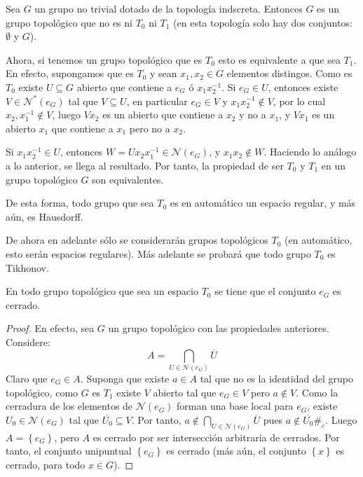 \documentclass[12pt]{report}
\theoremstyle{largebreak}
\newcommand{\N}[1]{\ensuremath{\mathscr{N}(#1)}}
\newcommand{\Ns}[1]{\ensuremath{\mathscr{N}^*(#1)}}
\newcommand{\contradiction}{\ensuremath{\#_c}}
\begin{document}
    \begin{exa}
        Sea $G$ un grupo no trivial dotado de la topología indscreta. Entonces $G$ es un grupo topológico que no es ni $T_0$ ni $T_1$ (en esta topología solo hay dos conjuntos: $\emptyset$ y $G$).
    
        Ahora, si tenemos un grupo topológico que es $T_0$ esto es equivalente a que sea $T_1$. En efecto, supongamos que es $T_0$ y sean $x_1,x_2\in G$ elementos distingos. Como es $T_0$ existe $U\subseteq G$ abierto que contiene a $e_G$ ó $x_1x_2^{-1}$. Si $e_G\in U$, entonces existe $V\in\Ns{e_G}$ tal que $V\subseteq U$, en particular $e_G\in V$ y $x_1x_2^{-1}\notin V$, por lo cual $x_2,x_1^{-1}\notin V$, luego $Vx_2$ es un abierto que contiene a $x_2$ y no a $x_1$, y $Vx_1$ es un abierto $x_1$ que contiene a $x_1$ pero no a $x_2$.

        Si $x_1x_2^{-1}\in U$, entonces $W=Ux_2x_1^{-1}\in\N{e_G}$, y $x_1x_2\notin W$. Haciendo lo análogo a lo anterior, se llega al resultado. Por tanto, la propiedad de ser $T_0$ y $T_1$ en un grupo topológico $G$ son equivalentes.
        
        De esta forma, todo grupo que sea $T_0$ es en automático un espacio regular, y más aún, es Hausdorff.
    \end{exa}

    De ahora en adelante sólo se considerarán grupos topológicos $T_0$ (en automático, esto serán espacios regulares). Más adelante se probará que todo grupo $T_0$ es Tikhonov.

    \begin{obs}
        En todo grupo topológico que sea un espacio $T_0$ se tiene que el conjunto $e_G$ es cerrado.
    \end{obs}

    \begin{proof}
        En efecto, sea $G$ un grupo topológico con las propiedades anteriores. Considere:
        \begin{equation*}
            A=\bigcap_{U\in\N{e_G}}\overline{U}
        \end{equation*}
        Claro que $e_G\in A$. Suponga que existe $a\in A$ tal que no es la identidad del grupo topológico, como $G$ es $T_1$ existe $V$ abierto tal que $e_G\in V$ pero $a\notin V$. Como la cerradura de los elementos de $\N{e_G}$ forman una base local para $e_G$, existe $U_0\in\N{e_G}$ tal que $\overline{U_0}\subseteq V$. Por tanto, $a\notin \bigcap_{U\in\N{e_G}}\overline{U}$ pues $a\notin \overline{U_0}$\contradiction. Luego $A=\left\{e_G\right\}$, pero $A$ es cerrado por ser intersección arbitraria de cerrados. Por tanto, el conjunto unipuntual $\left\{e_G\right\}$ es cerrado (más aún, el conjunto $\left\{x\right\}$ es cerrado, para todo $x\in G$).
    \end{proof}
\end{document}
